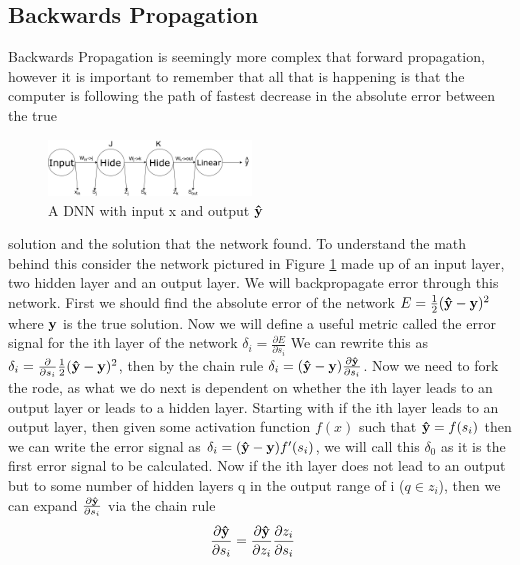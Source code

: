 \documentclass[a4paper]{article}
\begin{document}
\subsection{Backwards Propagation}
Backwards Propagation is seemingly more complex that forward propagation, however it is important to remember that all that is happening is that the computer is following the path of fastest decrease in the absolute error between the true
\begin{figure}
	\begin{center}
    	\includegraphics[width=0.48\textwidth]{jknetwork}
    \end{center}
    \caption{A DNN with input x and output $\vu{y}$}
    \label{BProp}
\end{figure}
solution and the solution that the network found. To understand the math behind this consider the network pictured in Figure \ref{BProp} made up of an input layer, two hidden layer and an output layer. We will backpropagate error through this network. First we should find the absolute error of the network $E=\frac{1}{2}(\vu{y}-\vb{y})^{2}$ where $\vb{y}$ is the true solution. Now we will define a useful metric called the error signal for the ith layer of the network $\delta_{i}=\frac{\partial E}{\partial s_{i}}$ We can rewrite this as $\delta_{i}=\frac{\partial}{\partial s_{i}}\frac{1}{2}(\vu{y}-\vb{y})^{2}$, then by the chain rule $\delta_{i}=(\vu{y}-\vb{y})\frac{\partial \vu{y}}{\partial s_{i}}$. Now we need to fork the rode, as what we do next is dependent on whether the ith layer leads to an output layer or leads to a hidden layer. Starting with if the ith layer leads to an output layer, then given some activation function $f(x)$ such that $\vu{y}=f(s_{i})$ then we can write the error signal as $\delta_{i}=(\vu{y}-\vb{y})f'(s_{i})$, we will call this $\delta_{0}$ as it is the first error signal to be calculated. Now if the ith layer does not lead to an output but to some number of hidden layers q in the output range of i ($q\in z_{i}$), then we can expand $\frac{\partial \vu{y}}{\partial s_{i}}$ via the chain rule
\begin{align*}
	\frac{\partial \vu{y}}{\partial s_{i}} &= \frac{\partial \vu{y}}{\partial z_{i}}\frac{\partial z_{i}}{\partial s_{i}}
\end{align*}
\end{document}
